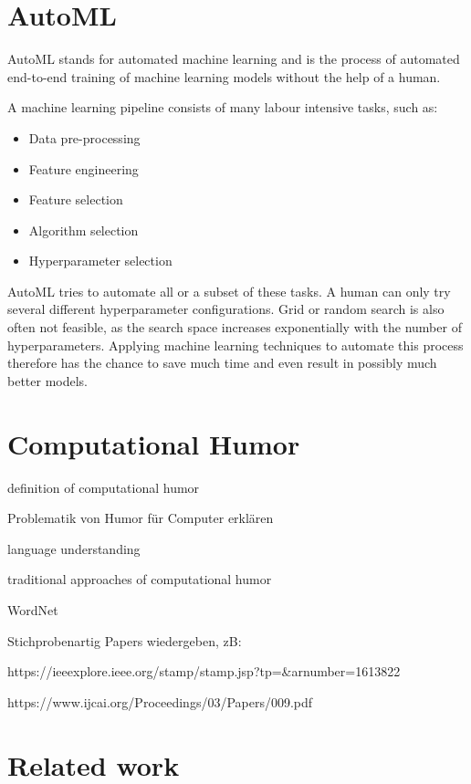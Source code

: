 \documentclass[draft,final,oneside]{vutinfth} %
\begin{document}

\section{AutoML}
AutoML stands for automated machine learning and is the process of automated end-to-end training of machine learning models without the help of a human.

A machine learning pipeline consists of many labour intensive tasks, such as:

\begin{itemize}
\item Data pre-processing
\item Feature engineering
\item Feature selection
\item Algorithm selection
\item Hyperparameter selection
\end{itemize}

AutoML tries to automate all or a subset of these tasks. A human can only try several different hyperparameter configurations. Grid or random search is also often not feasible, as the search space increases exponentially with the number of hyperparameters. Applying machine learning techniques to automate this process therefore has the chance to save much time and even result in possibly much better models.


\section{Computational Humor}
definition of computational humor

Problematik von Humor für Computer erklären

language understanding

traditional approaches of computational humor

WordNet 

Stichprobenartig Papers wiedergeben, zB: 

https://ieeexplore.ieee.org/stamp/stamp.jsp?tp=\&arnumber=1613822

https://www.ijcai.org/Proceedings/03/Papers/009.pdf

\section{Related work}
\end{document}
